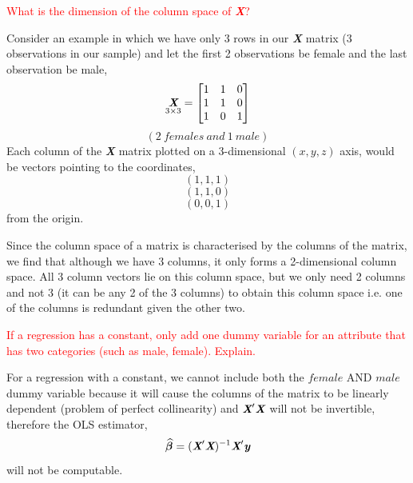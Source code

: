 \documentclass[12pt]{report}
\begin{document}
\noindent \textcolor{red}
{
	What is the dimension of the column space of \textit{\textbf{X}}?
}

\noindent Consider an example in which we have only 3 rows in our \textit{\textbf{X}} matrix (3 observations in our sample) and let the first 2 observations be female and the last observation be male,
$$
\underset{3\times3}{\textit{\textbf{X}}}
=
\begin{bmatrix}
1 & 1 & 0\\
1 & 1 & 0\\
1 & 0 & 1
\end{bmatrix}
$$
$$(2\ females\ and\ 1\ male)$$
\noindent Each column of the \textit{\textbf{X}} matrix plotted on a 3-dimensional $(x,y,z)$ axis, would be vectors pointing to the coordinates,
$$(1,1,1)$$
$$(1,1,0)$$
$$(0,0,1)$$
\noindent from the origin.

\noindent Since the column space of a matrix is characterised by the columns of the matrix, we find that although we have 3 columns, it only forms a 2-dimensional column space. All 3 column vectors lie on this column space, but we only need 2 columns and not 3 (it can be any 2 of the 3 columns) to obtain this column space i.e. one of the columns is redundant given the other two.

\noindent \textcolor{red}
{
	If a regression has a constant, only add one dummy variable for an attribute that has two categories (such as male, female). Explain.
}

\noindent For a regression with a constant, we cannot include both the $female$ AND $male$ dummy variable because it will cause the columns of the matrix to be linearly dependent (problem of perfect collinearity) and $\textit{\textbf{X}}'\textit{\textbf{X}}$ will not be invertible, therefore the OLS estimator, 
$$
\widehat{\boldsymbol{\beta}} 
= (\textit{\textbf{X}}'\textit{\textbf{X}})^{-1}\textit{\textbf{X}}'\textit{\textbf{y}}
$$
\noindent will not be computable.
\end{document}
